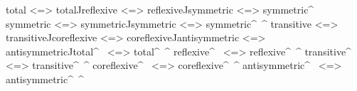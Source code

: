 \begin{code}
total <=> total^^
reflexive <=> reflexive^^
symmetric <=> symmetric^~
symmetric <=> symmetric^^
symmetric <=> symmetric^~^
transitive <=> transitive^^
coreflexive <=> coreflexive^^
antisymmetric <=> antisymmetric^^
total^~ <=> total^~^
reflexive^~ <=> reflexive^~^
transitive^~ <=> transitive^~^
coreflexive^~ <=> coreflexive^~^
antisymmetric^~ <=> antisymmetric^~^
\end{code}
